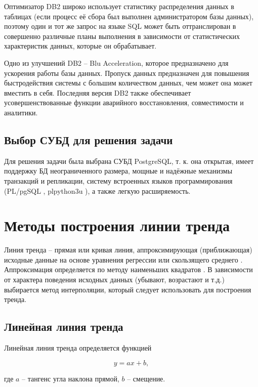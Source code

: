 \documentclass[a4paper,14pt]{extreport}
\begin{document}
Оптимизатор DB2 широко использует статистику распределения данных в таблицах (если процесс её сбора был выполнен администратором базы данных), поэтому один и тот же запрос на языке SQL может быть оттранслирован в совершенно различные планы выполнения в зависимости от статистических характеристик данных, которые он обрабатывает.

Одно из улучшений DB2 -- Blu Acceleration, которое предназначено для ускорения работы базы данных. Пропуск данных предназначен для повышения быстродействия системы с большим количеством данных, чем может она может вместить в себя. Последняя версия DB2 также обеспечивает усовершенствованные функции аварийного восстановления, совместимости и аналитики.

\subsection{Выбор СУБД для решения задачи}

Для решения задачи была выбрана СУБД PostgreSQL, т. к. она открытая, имеет поддержку БД неограниченного размера, мощные и надёжные механизмы транзакций и репликации, систему встроенных языков программирования (PL/pgSQL \cite{plpgsql}, plpython3u \cite{plpython3u}), а также легкую расширяемость.

\section{Методы построения линии тренда}

Линия тренда -- прямая или кривая линия, аппроксимирующая (приближающая) исходные данные на основе уравнения регрессии или скользящего среднего \cite{lt_exel}. Аппроксимация определяется по ме­тоду наименьших квадратов \cite{mnk}. В зависимости от характера поведения исходных данных (убыва­ют, возрастают и т.д.) выбирается метод интерполяции, который сле­дует использовать для построения тренда.

\subsection{Линейная линия тренда}

Линейная линия тренда определяется функцией

\begin{equation}
	y = ax + b,
\end{equation}

где $a$ -- тангенс угла наклона прямой, $b$ -- смещение.
\end{document}
